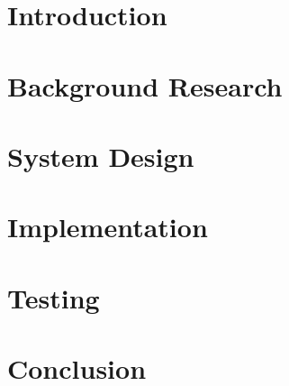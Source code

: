 \documentclass[12pt]{report}
\begin{document}
\newpage
\makenomenclature

\printnomenclature[1in]

\newpage
{}
\tableofcontents

\newpage
{}
\listoffigures


\chapter{Introduction}


\chapter{Background Research}


\chapter{System Design}


\chapter{Implementation}


\chapter{Testing}


\chapter{Conclusion}


\end{document}
